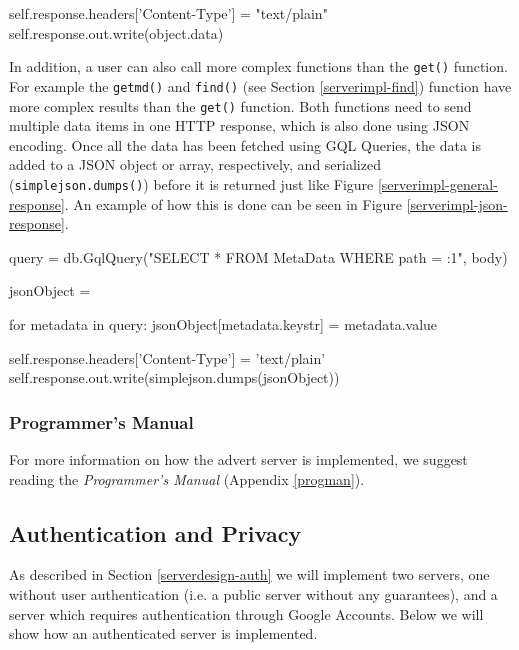 \begin{figure*}[ht] %
\begin{center}
\begin{code}
self.response.headers['Content-Type'] = "text/plain"
self.response.out.write(object.data)
\end{code}
\caption{HTTP Response.\label{serverimpl-general-response}}
\end{center}
\end{figure*}

In addition, a user can also call more complex functions than the
\texttt{get()} function. For example the \texttt{getmd()} and \texttt{find()}
(see Section \ref{serverimpl-find}) function have more complex results than the
\texttt{get()} function. Both functions need to send multiple data items in one
HTTP response, which is also done using JSON encoding. Once all the data has been
fetched using GQL Queries, the data is added to a JSON object or array,
respectively, and serialized (\texttt{simplejson.dumps()}) before it is returned
just like Figure \ref{serverimpl-general-response}. An example of how this is
done can be seen in Figure \ref{serverimpl-json-response}.

\begin{figure*}[ht] %
\begin{center}
\begin{code}
query = db.GqlQuery("SELECT * FROM MetaData WHERE path = :1", body)

jsonObject = {}

for metadata in query:
  jsonObject[metadata.keystr] = metadata.value
  
self.response.headers['Content-Type'] = 'text/plain'
self.response.out.write(simplejson.dumps(jsonObject)) 
\end{code}
\caption{HTTP Response.\label{serverimpl-json-response}}
\end{center}
\end{figure*}

\subsubsection{Programmer's Manual}
For more information on how the advert server is implemented, we suggest reading
the \emph{Programmer's Manual} (Appendix \ref{progman}).

\subsection{Authentication and Privacy}
As described in Section \ref{serverdesign-auth} we will implement two servers,
one without user authentication (i.e. a public server without any guarantees),
and a server which requires authentication through Google Accounts. Below we
will show how an authenticated server is implemented.

